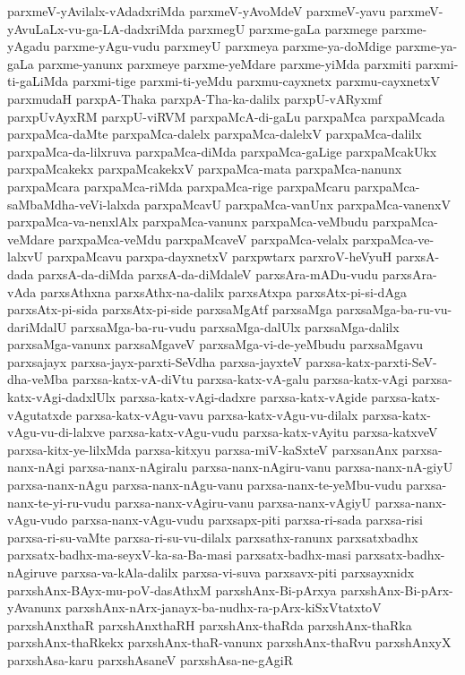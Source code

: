 {parxmeV-yAvilalx-vAdadxriMda
parxmeV-yAvoMdeV
parxmeV-yavu
parxmeV-yAvuLaLx-vu-ga-LA-dadxriMda
parxmegU
parxme-gaLa
parxmege
parxme-yAgadu
parxme-yAgu-vudu
parxmeyU
parxmeya
parxme-ya-doMdige
parxme-ya-gaLa
parxme-yanunx
parxmeye
parxme-yeMdare
parxme-yiMda
parxmiti
parxmi-ti-gaLiMda
parxmi-tige
parxmi-ti-yeMdu
parxmu-cayxnetx
parxmu-cayxnetxV
parxmudaH
parxpA-Thaka
parxpA-Tha-ka-dalilx
parxpU-vARyxmf
parxpUvAyxRM
parxpU-viRVM
parxpaMcA-di-gaLu
parxpaMca
parxpaMcada
parxpaMca-daMte
parxpaMca-dalelx
parxpaMca-dalelxV
parxpaMca-dalilx
parxpaMca-da-lilxruva
parxpaMca-diMda
parxpaMca-gaLige
parxpaMcakUkx
parxpaMcakekx
parxpaMcakekxV
parxpaMca-mata
parxpaMca-nanunx
parxpaMcara
parxpaMca-riMda
parxpaMca-rige
parxpaMcaru
parxpaMca-saMbaMdha-veVi-lalxda
parxpaMcavU
parxpaMca-vanUnx
parxpaMca-vanenxV
parxpaMca-va-nenxlAlx
parxpaMca-vanunx
parxpaMca-veMbudu
parxpaMca-veMdare
parxpaMca-veMdu
parxpaMcaveV
parxpaMca-velalx
parxpaMca-ve-lalxvU
parxpaMcavu
parxpa-dayxnetxV
parxpwtarx
parxroV-heVyuH
parxsA-dada
parxsA-da-diMda
parxsA-da-diMdaleV
parxsAra-mADu-vudu
parxsAra-vAda
parxsAthxna
parxsAthx-na-dalilx
parxsAtxpa
parxsAtx-pi-si-dAga
parxsAtx-pi-sida
parxsAtx-pi-side
parxsaMgAtf
parxsaMga
parxsaMga-ba-ru-vu-dariMdalU
parxsaMga-ba-ru-vudu
parxsaMga-dalUlx
parxsaMga-dalilx
parxsaMga-vanunx
parxsaMgaveV
parxsaMga-vi-de-yeMbudu
parxsaMgavu
parxsajayx
parxsa-jayx-parxti-SeVdha
parxsa-jayxteV
parxsa-katx-parxti-SeV-dha-veMba
parxsa-katx-vA-diVtu
parxsa-katx-vA-galu
parxsa-katx-vAgi
parxsa-katx-vAgi-dadxlUlx
parxsa-katx-vAgi-dadxre
parxsa-katx-vAgide
parxsa-katx-vAgutatxde
parxsa-katx-vAgu-vavu
parxsa-katx-vAgu-vu-dilalx
parxsa-katx-vAgu-vu-di-lalxve
parxsa-katx-vAgu-vudu
parxsa-katx-vAyitu
parxsa-katxveV
parxsa-kitx-ye-lilxMda
parxsa-kitxyu
parxsa-miV-kaSxteV
parxsanAnx
parxsa-nanx-nAgi
parxsa-nanx-nAgiralu
parxsa-nanx-nAgiru-vanu
parxsa-nanx-nA-giyU
parxsa-nanx-nAgu
parxsa-nanx-nAgu-vanu
parxsa-nanx-te-yeMbu-vudu
parxsa-nanx-te-yi-ru-vudu
parxsa-nanx-vAgiru-vanu
parxsa-nanx-vAgiyU
parxsa-nanx-vAgu-vudo
parxsa-nanx-vAgu-vudu
parxsapx-piti
parxsa-ri-sada
parxsa-risi
parxsa-ri-su-vaMte
parxsa-ri-su-vu-dilalx
parxsathx-ranunx
parxsatxbadhx
parxsatx-badhx-ma-seyxV-ka-sa-Ba-masi
parxsatx-badhx-masi
parxsatx-badhx-nAgiruve
parxsa-va-kAla-dalilx
parxsa-vi-suva
parxsavx-piti
parxsayxnidx
parxshAnx-BAyx-mu-poV-dasAthxM
parxshAnx-Bi-pArxya
parxshAnx-Bi-pArx-yAvanunx
parxshAnx-nArx-janayx-ba-nudhx-ra-pArx-kiSxVtatxtoV
parxshAnxthaR
parxshAnxthaRH
parxshAnx-thaRda
parxshAnx-thaRka
parxshAnx-thaRkekx
parxshAnx-thaR-vanunx
parxshAnx-thaRvu
parxshAnxyX
parxshAsa-karu
parxshAsaneV
parxshAsa-ne-gAgiR
}
